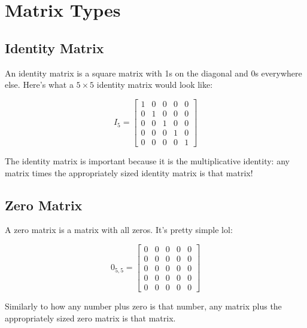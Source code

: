 \documentclass[12pt]{report}
\begin{document}
    \section{Matrix Types}
        \subsection{Identity Matrix}
            An identity matrix is a square matrix with 1s on the diagonal and 0s everywhere else. Here's what a $5 \times 5$ identity matrix would look like: 

            \begin{equation}
                I_5 = 
                \begin{bmatrix}
                      1 & 0 & 0 & 0 & 0 \\
                      0 & 1 & 0 & 0 & 0 \\
                      0 & 0 & 1 & 0 & 0 \\
                      0 & 0 & 0 & 1 & 0 \\
                      0 & 0 & 0 & 0 & 1
                \end{bmatrix}
            \end{equation}

            The identity matrix is important because it is the multiplicative identity: any matrix times the appropriately sized identity matrix is that matrix!

        \subsection{Zero Matrix}
            A zero matrix is a matrix with all zeros. It's pretty simple lol:

            \begin{equation}
                0_{5,5} = 
                \begin{bmatrix}
                      0 & 0 & 0 & 0 & 0 \\
                      0 & 0 & 0 & 0 & 0 \\
                      0 & 0 & 0 & 0 & 0 \\
                      0 & 0 & 0 & 0 & 0 \\
                      0 & 0 & 0 & 0 & 0
                \end{bmatrix}
            \end{equation}

            Similarly to how any number plus zero is that number, any matrix plus the appropriately sized zero matrix is that matrix.
\end{document}
